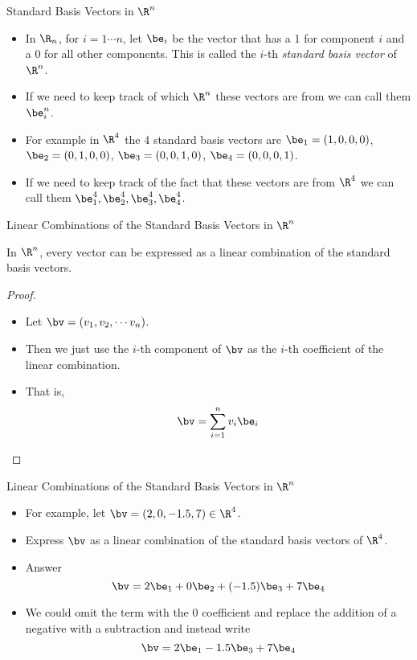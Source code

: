 \documentclass{beamer}
\begin{document}
\begin{frame}{Standard Basis Vectors in $\R^n$}

\begin{itemize}
\item In $\R_n$, for $i=1\cdots n$,
 let $\be_i$ be the vector that has a 1 for component $i$ and
a 0 for all other components. This is called the $i$-th
\emph{standard basis vector} of $\R^n$.
\item If we need to keep track of which $\R^n$ these vectors are from we can
call them $\be^n_i$.
\item For example in $\R^4$ the 4 standard basis vectors are
 $\be_1 = (1,0,0,0)$, $\be_2 = (0,1,0,0)$,
$\be_3 = (0,0,1,0)$, $\be_4 = (0,0,0,1)$.
\item If we need to keep track of the fact that these vectors are from $\R^4$
we can call them $\be_1^4, \be_2^4, \be_3^4, \be_4^4$.
\end{itemize}

\end{frame}

\begin{frame}{Linear Combinations of the Standard Basis Vectors in $\R^n$}

\begin{lemma}
In $\R^n$, every vector can be expressed as a linear combination of the standard
basis vectors.
\end{lemma}

\begin{proof}
\begin{itemize}
\item Let $\bv = (v_1, v_2, \cdots v_n)$.
\item Then we just use the $i$-th component of $\bv$ as the $i$-th coefficient
of the linear combination.
\item That is,
$$\bv = \sum _{i=1}^{n} v_i \be_i$$
\end{itemize}
\end{proof}

\end{frame}

\begin{frame}{Linear Combinations of the Standard Basis Vectors in $\R^n$}

\begin{itemize}
\item For example, let $\bv = (2, 0, -1.5, 7) \in \R^4$.
\item Express $\bv$ as a linear combination of the standard basis vectors of
$\R^4$.
\item Answer $$\bv = 2 \be_1 + 0 \be_2 + (-1.5) \be_3 + 7 \be_4$$
\item We could omit the term with the 0 coefficient and replace the addition
of a negative with a subtraction and instead write
$$\bv = 2 \be_1 -1.5 \be_3 + 7 \be_4$$
\end{itemize}

\end{frame}
\end{document}
